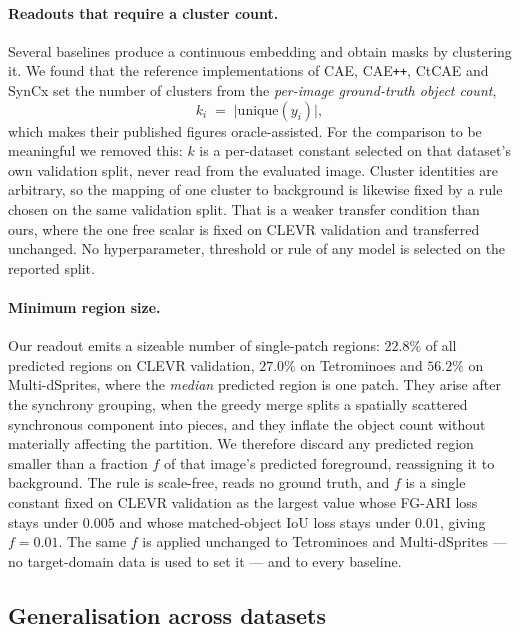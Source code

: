 \paragraph{Readouts that require a cluster count.}
Several baselines produce a continuous embedding and obtain masks by clustering it. We found that
the reference implementations of CAE, CAE\texttt{++}, CtCAE and SynCx set the number of clusters
from the \emph{per-image ground-truth object count},
\[
  k_i \;=\; \bigl| \mathrm{unique}(y_i) \bigr| ,
\]
which makes their published figures oracle-assisted. For the comparison to be meaningful we
removed this: $k$ is a per-dataset constant selected on that dataset's own validation split, never
read from the evaluated image. Cluster identities are arbitrary, so the mapping of one cluster to
background is likewise fixed by a rule chosen on the same validation split. That is a weaker
transfer condition than ours, where the one free scalar is fixed on CLEVR validation and
transferred unchanged. No hyperparameter, threshold or rule of any model is selected on the
reported split.

\paragraph{Minimum region size.}
\label{sec:minsize}
Our readout emits a sizeable number of single-patch regions: $22.8\%$ of all predicted regions on
CLEVR validation, $27.0\%$ on Tetrominoes and $56.2\%$ on Multi-dSprites, where the \emph{median}
predicted region is one patch. They arise after the synchrony grouping, when the greedy merge
splits a spatially scattered synchronous component into pieces, and they inflate the object count
without materially affecting the partition. We therefore discard any predicted region smaller
than a fraction $f$ of that image's predicted foreground, reassigning it to background. The rule
is scale-free, reads no ground truth, and $f$ is a single constant fixed on CLEVR validation as
the largest value whose FG-ARI loss stays under $0.005$ and whose matched-object IoU loss stays
under $0.01$, giving $f=0.01$. The same $f$ is applied unchanged to Tetrominoes and
Multi-dSprites --- no target-domain data is used to set it --- and to every baseline.

\subsection{Generalisation across datasets}
\label{sec:generalisation}

